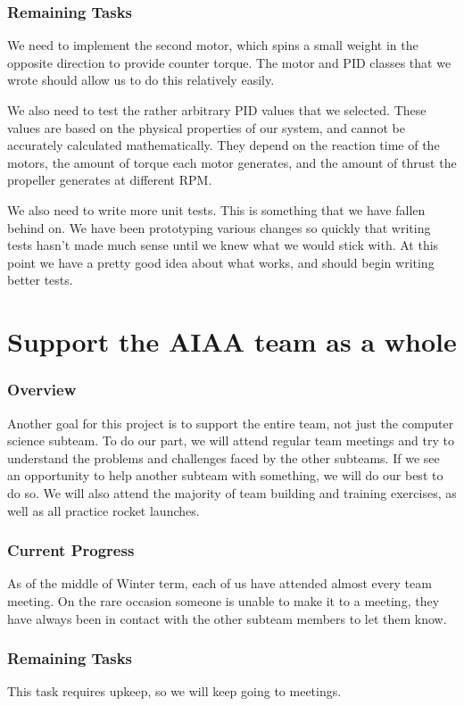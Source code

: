 \documentclass[onecolumn, draftclsnofoot, 10pt, compsoc]{IEEEtran}
\begin{document}
\subsubsection{Remaining Tasks}
We need to implement the second motor, which spins a small weight in the opposite direction to provide counter torque.  The motor and PID classes that we wrote should allow us to do this relatively easily.

We also need to test the rather arbitrary PID values that we selected.  These values are based on the physical properties of our system, and cannot be accurately calculated mathematically.  They depend on the reaction time of the motors, the amount of torque each motor generates, and the amount of thrust the propeller generates at different RPM.

We also need to write more unit tests.  This is something that we have fallen behind on.  We have been prototyping various changes so quickly that writing tests hasn't made much sense until we knew what we would stick with.  At this point we have a pretty good idea about what works, and should begin writing better tests.



\section{Support the AIAA team as a whole}
\subsubsection{Overview}
Another goal for this project is to support the entire team, not just the computer science subteam.  To do our part, we will attend regular team meetings and try to understand the problems and challenges faced by the other subteams.  If we see an opportunity to help another subteam with something, we will do our best to do so.  We will also attend the majority of team building and training exercises, as well as all practice rocket launches.

\subsubsection{Current Progress}
As of the middle of Winter term, each of us have attended almost every team meeting.  On the rare occasion someone is unable to make it to a meeting, they have always been in contact with the other subteam members to let them know.

\subsubsection{Remaining Tasks}
This task requires upkeep, so we will keep going to meetings.

\end{document}
